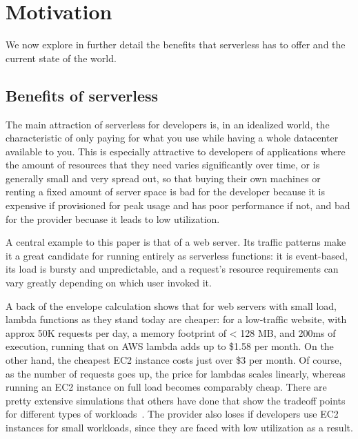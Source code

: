 \section{Motivation}\label{motivation}

We now explore in further detail the benefits that serverless has to offer and
the current state of the world.

\subsection{Benefits of serverless}

The main attraction of serverless for developers is, in an idealized world, the
characteristic of only paying for what you use while having a whole datacenter
available to you. This is especially attractive to developers of applications
where the amount of resources that they need varies significantly over time, or
is generally small and very spread out, so that buying their own machines or
renting a fixed amount of server space is bad for the developer because it is
expensive if provisioned for peak usage and has poor performance if not, and bad
for the provider becuase it leads to low utilization.

A central example to this paper is that of a web server. Its traffic patterns
make it a great candidate for running entirely as serverless functions: it is
event-based, its load is bursty and unpredictable, and a request's resource
requirements can vary greatly depending on which user invoked it.


A back of the envelope calculation shows that for web servers with small load,
lambda functions as they stand today are cheaper: for a low-traffic website,
with approx 50K requests per day, a memory footprint of < 128 MB, and 200ms of
execution, running that on AWS lambda adds up to \$1.58 per month. On the other
hand, the cheapest EC2 instance costs just over \$3 per month. Of course, as the
number of requests goes up, the price for lambdas scales linearly, whereas
running an EC2 instance on full load becomes comparably cheap. There are pretty
extensive simulations that others have done that show the tradeoff points for
different types of workloads~\cite{econ-of-serverless,trek10-blog}. The provider
also loses if developers use EC2 instances for small workloads, since they are
faced with low utilization as a result.

